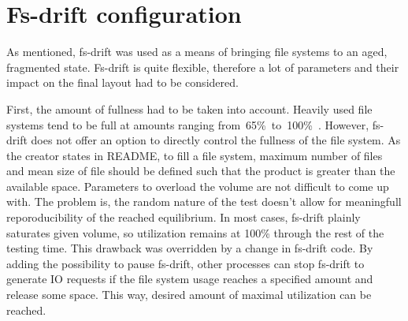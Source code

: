 \documentclass[
  color, %
  table, %
  lof,   %
  lot,   %
]{fithesis3}
\begin{document}
\section{Fs-drift configuration}
As mentioned, fs-drift was used as a means of bringing file systems to an aged, fragmented state. Fs-drift is quite flexible, therefore a lot of parameters and their impact on the final layout had to be considered.

First, the amount of fullness had to be taken into account. Heavily used file systems tend to be full at amounts ranging from~65\%~to~100\%~\cite{agrawal2007five,Smith:1997:FSA:258623.258689}. However, fs-drift does not offer an option to directly control the fullness of the file system. As the creator states in README, to fill a file system, maximum number of files and mean size of file should be defined such that the product is greater than the available space. Parameters to overload the volume are not difficult to come up with. The problem is, the random nature of the test doesn't allow for meaningfull reporoducibility of the reached equilibrium. In most cases, fs-drift plainly saturates given volume, so utilization remains at 100\% through the rest of the testing time. This drawback was overridden by a change in fs-drift code\footnotemark[1]. By adding the possibility to pause fs-drift, other processes can stop fs-drift to generate IO requests if the file system usage reaches a specified amount and release some space. This way, desired amount of maximal utilization can be reached.








\end{document}
